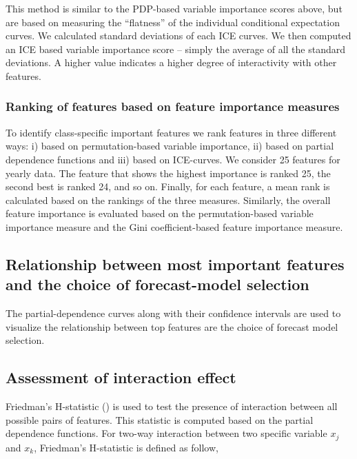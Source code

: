 \documentclass[11pt,a4paper,]{article}
\begin{document}
This method is similar to the PDP-based variable importance scores above, but are based on measuring the ``flatness'' of the individual conditional expectation curves. We calculated standard deviations of each ICE curves. We then computed an ICE based variable importance score -- simply the average of all the standard deviations. A higher value indicates a higher degree of interactivity with other features.

\hypertarget{ranking-of-features-based-on-feature-importance-measures}{%
\subsubsection{Ranking of features based on feature importance measures}\label{ranking-of-features-based-on-feature-importance-measures}}

To identify class-specific important features we rank features in three different ways: i) based on permutation-based variable importance, ii) based on partial dependence functions and iii) based on ICE-curves. We consider 25 features for yearly data. The feature that shows the highest importance is ranked 25, the second best is ranked 24, and so on. Finally, for each feature, a mean rank is calculated based on the rankings of the three measures. Similarly, the overall feature importance is evaluated based on the permutation-based variable importance measure and the Gini coefficient-based feature importance measure.

\hypertarget{relationship-between-most-important-features-and-the-choice-of-forecast-model-selection}{%
\subsection{Relationship between most important features and the choice of forecast-model selection}\label{relationship-between-most-important-features-and-the-choice-of-forecast-model-selection}}

The partial-dependence curves along with their confidence intervals are used to visualize the relationship between top features are the choice of forecast model selection.

\hypertarget{assessment-of-interaction-effect}{%
\subsection{Assessment of interaction effect}\label{assessment-of-interaction-effect}}

Friedman's H-statistic (\textcite{friedman2008predictive}) is used to test the presence of interaction between all possible pairs of features. This statistic is computed based on the partial dependence functions. For two-way interaction between two specific variable \(x_j\) and \(x_k\), Friedman's H-statistic is defined as follow,
\end{document}
